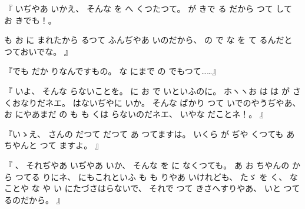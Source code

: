 『
いぢやあ
いかえ、
%
そんな
を
へ
くつたつて。
%
が
きで
る
だから
つて
して
お
きでも！。

も
お
に
まれたから
るつて
ふんぢやあ
いのだから、
%
の
で
な
を
て
るんだと
つておいでな。
』

『でも
だか
りなんですもの。
%
な
にまで
の
でもつて……』%

『
いよ、
%
そんな
らないことを。
%
に
お
で
いといふのに。
%
ホヽヽお
は
は
が
さくおなりだネエ。
%
はないぢやに
いか。
%
そんな
ばかり
つて
いでのやうぢやあ、
%
お
にやあまだ
の
も
も
くは
らないのだネエ、
%
いやな
だことネ！。
』

『いゝえ、
%
さんの
だつて
だつて
あ
つてますは。
%
いくら
が
ぢや
くつても
あちやんと
つて
ますよ。
』

『
、
%
それぢやあ
いぢやあ
いか、
%
そんな
を
に
なくつても。
%
あ
お
ちやんの
から
つてる
りにネ、
%
にもこれといふ
も
も
りやあ
いけれども、
%
たゞ
を
く、
%
なことや
な
や
い
にたづさはらないで、
%
それで
つて%
きさへすりやあ、
%
いと
つてるのだから。
』

